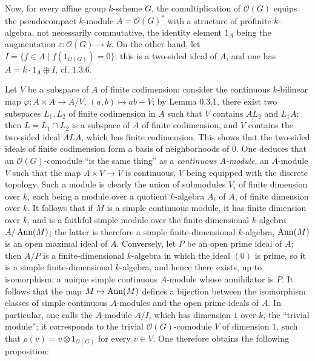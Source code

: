 Now, for every affine group $k$-scheme $G$, the comultiplication of $\mathcal O(G)$ equips the pseudocompact $k$-module $A=\mathcal O(G)^*$ with a structure of profinite $k$-algebra, not necessarily commutative, the identity element $1_A$ being the augmentation $\varepsilon:\mathcal O(G)\to k$. On the other hand, let $I=\{f\in A\mid f(1_{\mathcal O(G)})=0\}$; this is a two-sided ideal of $A$, and one has $A=k\cdot1_A\oplus I$, cf. 1.3.6.

Let $V$ be a subspace of $A$ of finite codimension; consider the continuous $k$-bilinear map $\varphi:A\times A\to A/V$, $(a,b)\mapsto ab+V$; by Lemma 0.3.1, there exist two subspaces $L_1,L_2$ of finite codimension in $A$ such that $V$ contains $AL_2$ and $L_1A$; then $L=L_1\cap L_2$ is a subspace of $A$ of finite codimension, and $V$ contains the two-sided ideal $ALA$, which has finite codimension. This shows that the two-sided ideals of finite codimension form a basis of neighborhoods of $0$. One deduces that an $\mathcal O(G)$-comodule ``is the same thing'' as a \emph{continuous $A$-module}, \ie an $A$-module $V$ such that the map $A\times V\to V$ is continuous, $V$ being equipped with the discrete topology. Such a module is clearly the union of submodules $V_i$ of finite dimension over $k$, each being a module over a quotient $k$-algebra $A_i$ of $A$, of finite dimension over $k$. It follows that if $M$ is a simple continuous module, it has finite dimension over $k$, and is a faithful simple module over the finite-dimensional $k$-algebra $A/\operatorname{Ann}(M)$; the latter is therefore a simple finite-dimensional $k$-algebra, \ie $\operatorname{Ann}(M)$ is an open maximal ideal of $A$. Conversely, let $P$ be an open prime ideal of $A$; then $A/P$ is a finite-dimensional $k$-algebra in which the ideal $(0)$ is prime, so it is a simple finite-dimensional $k$-algebra, and hence there exists, up to isomorphism, a unique simple continuous $A$-module whose annihilator is $P$. It follows that the map $M\mapsto\operatorname{Ann}(M)$ defines a bijection between the isomorphism classes of simple continuous $A$-modules and the open prime ideals of $A$. In particular, one calls the $A$-module $A/I$, which has dimension $1$ over $k$, the ``trivial module''; it corresponds to the trivial $\mathcal O(G)$-comodule $V$ of dimension $1$, \ie such that $\rho(v)=v\otimes1_{\mathcal O(G)}$ for every $v\in V$. One therefore obtains the following proposition:
